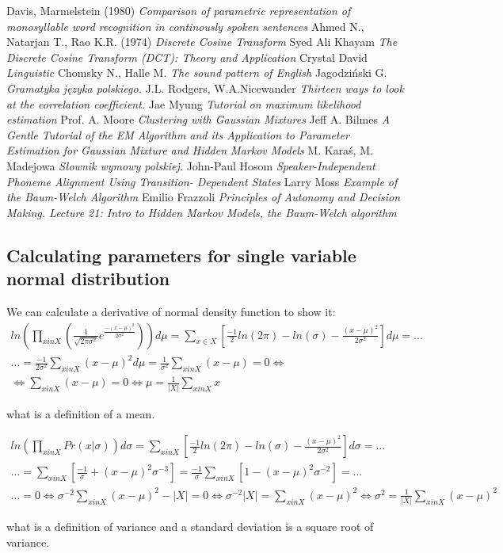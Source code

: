 \documentclass[12pt,a4paper,english]{article}
\begin{document}
\begin{thebibliography}{99}
\bibitem{} Davis, Marmelstein (1980) \emph{Comparison of parametric representation of monosyllable word recognition in continously spoken sentences}
\bibitem{} Ahmed N., Natarjan T., Rao K.R. (1974) \emph{Discrete Cosine Transform}
\bibitem{} Syed Ali Khayam \emph{The Discrete Cosine Transform (DCT): Theory and Application} 
\bibitem{} Crystal David \emph{Linguistic}
\bibitem{} Chomsky N., Halle M. \emph{The sound pattern of English}
\bibitem{} Jagodziński G. \emph{Gramatyka języka polskiego.}
\bibitem{} J.L. Rodgers, W.A.Nicewander \emph{Thirteen ways to look at the correlation coefficient.}
\bibitem{} Jae Myung \emph{Tutorial on maximum likelihood estimation}
\bibitem{} Prof. A. Moore \emph{Clustering with Gaussian Mixtures}
\bibitem{} Jeff A. Bilmes \emph{A Gentle Tutorial of the EM Algorithm and its Application to Parameter Estimation for Gaussian Mixture and Hidden Markov Models}
\bibitem{} M. Karaś, M. Madejowa \emph{Słownik wymowy polskiej.}
\bibitem{} John-Paul Hosom \emph{Speaker-Independent Phoneme Alignment Using Transition- Dependent States}
\bibitem{} Larry Moss \emph{Example of the Baum-Welch Algorithm}
\bibitem{} Emilio Frazzoli \emph{Principles of Autonomy and Decision Making. Lecture 21: Intro to Hidden Markov Models, the Baum-Welch algorithm}
\end{thebibliography}

\newpage
\begin{appendices}
\section{Calculating parameters for single variable normal distribution}
We can calculate a derivative of normal density function to show it:
\begin{multline}
    ln(\prod_{x in X} (\frac 1 {\sqrt{2\pi\sigma^2}} e^{\frac{-(x-\mu)^2}{2\sigma^2}}))d\mu  = \sum_{x \in X}[\frac{-1} 2 ln(2\pi)-ln(\sigma)- \frac{(x-\mu)^2} {2 \sigma^2} ]d\mu = ... \\
    ...= \frac {-1} {2 \sigma^2} \sum_{x in X}{(x-\mu)^2}d\mu = \frac 1 {\sigma^2} \sum_{x in X}{(x-\mu)}=0 \iff \\
    \iff \sum_{x in X}{(x-\mu)}=0 \iff \mu = \frac 1 {|X|} \sum_{x in X}x
\end{multline}

what is a definition of a mean. \newline 

\begin{multline}
    ln(\prod_{x in X} Pr(x | \sigma))d\sigma = \sum_{x in X}[\frac {-1} 2 ln(2\pi)-ln(\sigma)- \frac {(x-\mu)^2} {2 \sigma^2} ]d\sigma = ... \\
    ...= \sum_{x in X}[\frac {-1} \sigma + (x-\mu)^2 \sigma^{-3}] = \frac {-1} {\sigma} \sum_{x in X}[1-(x-\mu)^2 \sigma^{-2}]=... \\
    ...= 0 \iff \sigma^{-2} \sum_{x in X}(x-\mu)^2 - | X |=0 \iff \sigma^{-2} | X | = \sum_{x in X}(x-\mu)^2 \iff \sigma^2 = \frac 1 {|X|} \sum_{x in X}(x-\mu)^2
\end{multline}

what is a definition of variance and a standard deviation is a square root of variance. \newline
\end{appendices}
\end{document}
